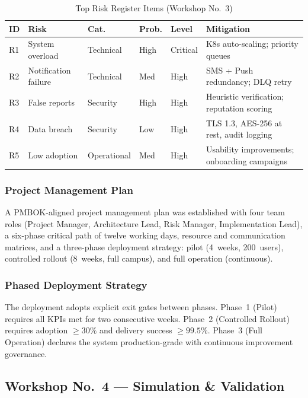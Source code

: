 \documentclass[11pt,a4paper]{article}
\begin{document}
\begin{table}[H]
\centering
\caption{Top Risk Register Items (Workshop No.\ 3)}
\label{tab:risks}
\small
\begin{tabularx}{\textwidth}{l l l l l X}
\toprule
\textbf{ID} & \textbf{Risk} & \textbf{Cat.} & \textbf{Prob.} & \textbf{Level} & \textbf{Mitigation} \\
\midrule
R1 & System overload & Technical & High & Critical & K8s auto-scaling; priority queues \\
R2 & Notification failure & Technical & Med & High & SMS + Push redundancy; DLQ retry \\
R3 & False reports & Security & High & High & Heuristic verification; reputation scoring \\
R4 & Data breach & Security & Low & High & TLS 1.3, AES-256 at rest, audit logging \\
R5 & Low adoption & Operational & Med & High & Usability improvements; onboarding campaigns \\
\bottomrule
\end{tabularx}
\end{table}

\subsubsection{Project Management Plan}

A PMBOK-aligned project management plan was established with four team roles (Project Manager, Architecture Lead, Risk Manager, Implementation Lead), a six-phase critical path of twelve working days, resource and communication matrices, and a three-phase deployment strategy: pilot (4~weeks, 200~users), controlled rollout (8~weeks, full campus), and full operation (continuous).

\subsubsection{Phased Deployment Strategy}

The deployment adopts explicit exit gates between phases. Phase~1 (Pilot) requires all KPIs met for two consecutive weeks. Phase~2 (Controlled Rollout) requires adoption $\geq30\%$ and delivery success $\geq99.5\%$. Phase~3 (Full Operation) declares the system production-grade with continuous improvement governance.

\subsection{Workshop No.\ 4 --- Simulation \& Validation}
\end{document}
